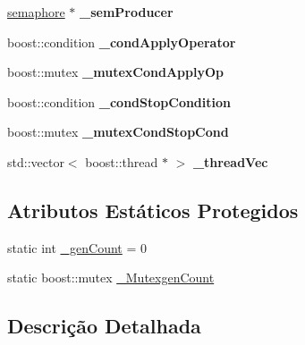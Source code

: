 \begin{DoxyCompactItemize}
\item 
\hypertarget{classgenetic__operator__thread_ae9a9af2ff152c15152f42de2c02be1e3}{
\hyperlink{classsemaphore}{semaphore} $\ast$ {\bfseries \_\-semProducer}}
\label{classgenetic__operator__thread_ae9a9af2ff152c15152f42de2c02be1e3}

\item 
\hypertarget{classgenetic__operator__thread_ab1bee0ae612b0f61b9f2bb15b431ea26}{
boost::condition {\bfseries \_\-condApplyOperator}}
\label{classgenetic__operator__thread_ab1bee0ae612b0f61b9f2bb15b431ea26}

\item 
\hypertarget{classgenetic__operator__thread_a9fd8a736c036bb91234a54db69418464}{
boost::mutex {\bfseries \_\-mutexCondApplyOp}}
\label{classgenetic__operator__thread_a9fd8a736c036bb91234a54db69418464}

\item 
\hypertarget{classgenetic__operator__thread_ac45e4d73d9023af4c7998355b4302f28}{
boost::condition {\bfseries \_\-condStopCondition}}
\label{classgenetic__operator__thread_ac45e4d73d9023af4c7998355b4302f28}

\item 
\hypertarget{classgenetic__operator__thread_aa828c4d595704dcd561e1eec098e3ab3}{
boost::mutex {\bfseries \_\-mutexCondStopCond}}
\label{classgenetic__operator__thread_aa828c4d595704dcd561e1eec098e3ab3}

\item 
\hypertarget{classgenetic__operator__thread_a8007f81975ddd3911ef63682cabcd990}{
std::vector$<$ boost::thread $\ast$ $>$ {\bfseries \_\-threadVec}}
\label{classgenetic__operator__thread_a8007f81975ddd3911ef63682cabcd990}

\end{DoxyCompactItemize}
\subsection*{Atributos Estáticos Protegidos}
\begin{DoxyCompactItemize}
\item 
static int \hyperlink{classgenetic__operator__thread_acdf9606e26ae1240cd1c9fced36c656a}{\_\-genCount} = 0
\item 
static boost::mutex \hyperlink{classgenetic__operator__thread_afb4be1bcb256082a4d6e90faba3e5567}{\_\-MutexgenCount}
\end{DoxyCompactItemize}


\subsection{Descrição Detalhada}
